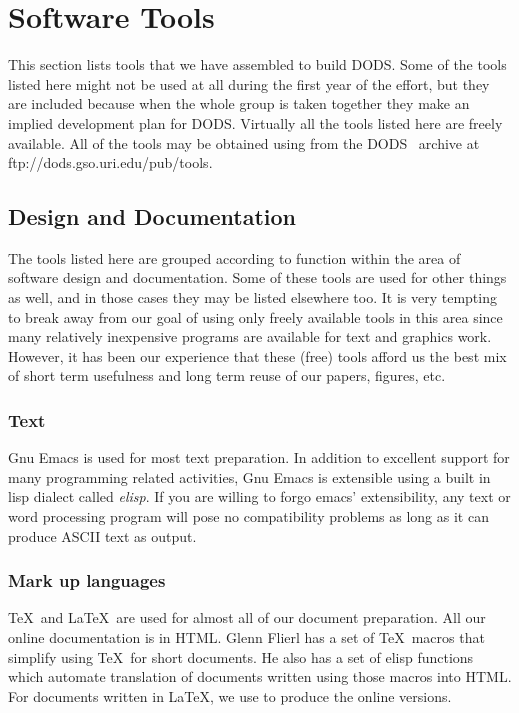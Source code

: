 \section{Software Tools}

This section lists tools that we have assembled to build DODS\@. Some of the
tools listed here might not be used at all during the first year of the
effort, but they are included because when the whole group is taken together
they make an implied development plan for DODS\@. Virtually all the tools
listed here are freely available. All of the tools may be obtained using \ftp
from the DODS \ftp\ archive at 
{ftp://dods.gso.uri.edu/pub/tools}.

\subsection{Design and Documentation}

The tools listed here are grouped according to function within the area of
software design and documentation. Some of these tools are used for other
things as well, and in those cases they may be listed elsewhere too. It is
very tempting to break away from our goal of using only freely available
tools in this area since many relatively inexpensive programs are available
for text and graphics work. However, it has been our experience that these
(free) tools afford us the best mix of short term usefulness and long term
reuse of our papers, figures, etc.

\subsubsection{Text}

Gnu Emacs is used for most text preparation. In addition to excellent support
for many programming related activities, Gnu Emacs is extensible using a
built in lisp dialect called {\em elisp}. If you are willing to forgo emacs'
extensibility, any text or word processing program will pose no compatibility
problems as long as it can produce ASCII text as output.

\subsubsection{Mark up languages}

\TeX\ and \LaTeX\ are used for almost all of our document preparation. All
our online documentation is in HTML\@. Glenn Flierl has a set of \TeX\ macros
that simplify using \TeX\ for short documents. He also has a set of elisp
functions which automate translation of documents written using those macros
into HTML\@.  For documents written in \LaTeX, we use \latextohtml to produce
the online versions.

